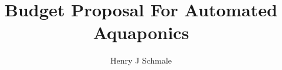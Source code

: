 \documentclass[]{article}
\title{Budget Proposal For Automated Aquaponics}
\author{Henry J Schmale}
\begin{document}
\maketitle

\begin{abstract}

\end{abstract}

\section{}
\end{document}
